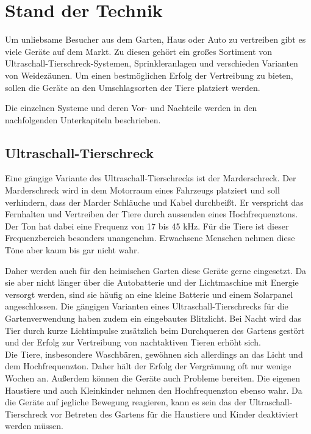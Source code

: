 
\section{Stand der Technik}

Um unliebsame Besucher aus dem Garten, Haus oder Auto zu vertreiben gibt es viele Geräte auf dem Markt. Zu diesen gehört ein großes Sortiment von Ultraschall-Tierschreck-Systemen, Sprinkleranlagen und verschieden Varianten von Weidezäunen. Um einen bestmöglichen Erfolg der Vertreibung zu bieten, sollen die Geräte an den Umschlagsorten der Tiere platziert werden.

Die einzelnen Systeme und deren Vor- und Nachteile werden in den nachfolgenden Unterkapiteln beschrieben.



\subsection{Ultraschall-Tierschreck} \label{ton_schreck}

Eine gängige Variante des Ultraschall-Tierschrecks ist der Marderschreck. Der Marderschreck wird in dem Motorraum eines Fahrzeugs platziert und soll verhindern, dass der Marder Schläuche und Kabel durchbeißt. Er verspricht das Fernhalten und Vertreiben der Tiere durch aussenden eines Hochfrequenztons. Der Ton hat dabei eine Frequenz von 17 bis 45 kHz. Für die Tiere ist dieser Frequenzbereich besonders unangenehm. Erwachsene Menschen nehmen diese Töne aber kaum bis gar nicht wahr. \cite{marderschreck}

Daher werden auch für den heimischen Garten diese Geräte gerne eingesetzt. Da sie aber nicht länger über die Autobatterie und der Lichtmaschine mit Energie versorgt werden, sind sie häufig an eine kleine Batterie und einem Solarpanel angeschlossen. Die gängigen Varianten eines Ultraschall-Tierschrecks für die Gartenverwendung haben zudem ein eingebautes Blitzlicht. Bei Nacht wird das Tier durch kurze Lichtimpulse zusätzlich beim Durchqueren des Gartens gestört und der Erfolg zur Vertreibung von nachtaktiven Tieren erhöht sich.
\\
Die Tiere, insbesondere Waschbären, gewöhnen sich allerdings an das Licht und dem Hochfrequenzton. Daher hält der Erfolg der Vergrämung oft nur wenige Wochen an.
Außerdem können die Geräte auch Probleme bereiten. Die eigenen Haustiere und auch Kleinkinder nehmen den Hochfrequenzton ebenso wahr. Da die Geräte auf jegliche Bewegung reagieren, kann es sein das der Ultraschall-Tierschreck vor Betreten des Gartens für die Haustiere und Kinder deaktiviert werden müssen. \cite{anti_wasch}


